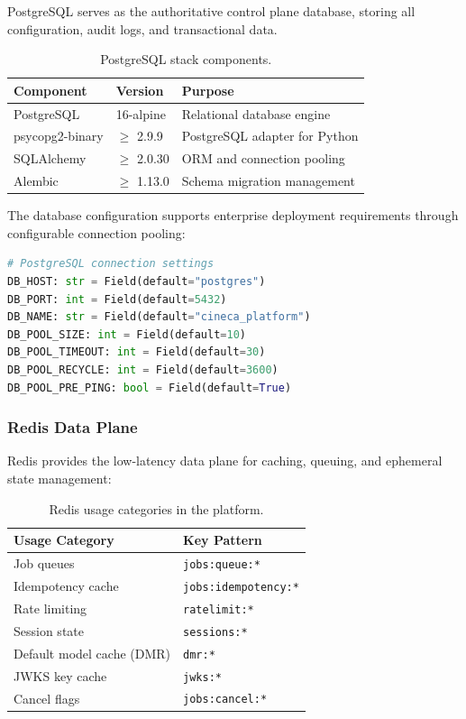PostgreSQL serves as the authoritative control plane database, storing all configuration, audit logs, and transactional data.

\begin{table}[ht]
\centering
\caption{PostgreSQL stack components.}
\label{tab:postgres-stack}
\small
\begin{tabular}{lll}
\hline
\textbf{Component} & \textbf{Version} & \textbf{Purpose} \\
\hline
PostgreSQL & 16-alpine & Relational database engine \\
psycopg2-binary & $\geq$ 2.9.9 & PostgreSQL adapter for Python \\
SQLAlchemy & $\geq$ 2.0.30 & ORM and connection pooling \\
Alembic & $\geq$ 1.13.0 & Schema migration management \\
\hline
\end{tabular}
\end{table}

The database configuration supports enterprise deployment requirements through configurable connection pooling:

\begin{lstlisting}[language=Python, caption={PostgreSQL configuration from \texttt{src/config.py}.}]
# PostgreSQL connection settings
DB_HOST: str = Field(default="postgres")
DB_PORT: int = Field(default=5432)
DB_NAME: str = Field(default="cineca_platform")
DB_POOL_SIZE: int = Field(default=10)
DB_POOL_TIMEOUT: int = Field(default=30)
DB_POOL_RECYCLE: int = Field(default=3600)
DB_POOL_PRE_PING: bool = Field(default=True)
\end{lstlisting}

\subsubsection{Redis Data Plane}

Redis provides the low-latency data plane for caching, queuing, and ephemeral state management:

\begin{table}[ht]
\centering
\caption{Redis usage categories in the platform.}
\label{tab:redis-usage}
\small
\begin{tabular}{ll}
\hline
\textbf{Usage Category} & \textbf{Key Pattern} \\
\hline
Job queues & \texttt{jobs:queue:*} \\
Idempotency cache & \texttt{jobs:idempotency:*} \\
Rate limiting & \texttt{ratelimit:*} \\
Session state & \texttt{sessions:*} \\
Default model cache (DMR) & \texttt{dmr:*} \\
JWKS key cache & \texttt{jwks:*} \\
Cancel flags & \texttt{jobs:cancel:*} \\
\hline
\end{tabular}
\end{table}

